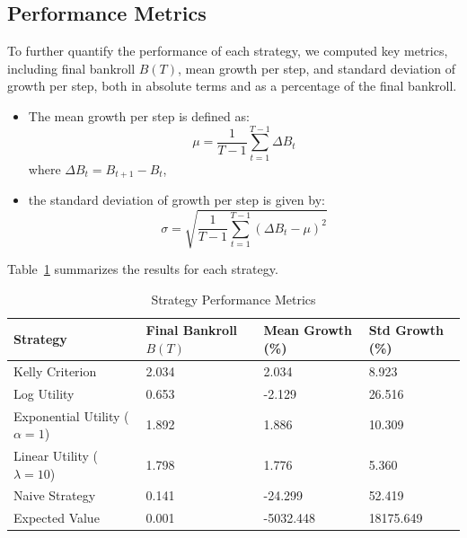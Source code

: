 \subsection{Performance Metrics}

To further quantify the performance of each strategy, we computed key metrics, including final bankroll \( B(T) \), mean growth per step, and standard deviation of growth per step, both in absolute terms and as a percentage of the final bankroll. 
\begin{itemize}
    \item The mean growth per step is defined as:
    \[
    \mu = \frac{1}{T-1} \sum_{t=1}^{T-1} \Delta B_t
    \]
    where \( \Delta B_t = B_{t+1} - B_t \),
    \item the standard deviation of growth per step is given by:
    \[
    \sigma = \sqrt{\frac{1}{T-1} \sum_{t=1}^{T-1} (\Delta B_t - \mu)^2}
    \]
\end{itemize}


Table~\ref{tab:strategy_performance} summarizes the results for each strategy.

\begin{table}[H]
\centering
\caption{Strategy Performance Metrics}
\label{tab:strategy_performance}
\begin{tabular}{llll}
\toprule
\textbf{Strategy}              & \textbf{Final Bankroll \( B(T) \)} & \textbf{Mean Growth (\%)} & \textbf{Std Growth (\%)} \\ 
\midrule
Kelly Criterion                & 2.034                              & 2.034                      & 8.923                    \\ 
Log Utility                    & 0.653                              & -2.129                     & 26.516                   \\ 
Exponential Utility (\( \alpha = 1 \)) & 1.892                        & 1.886                      & 10.309                   \\ 
Linear Utility (\( \lambda = 10 \))    & 1.798                        & 1.776                      & 5.360                    \\ 
Naive Strategy                 & 0.141                              & -24.299                    & 52.419                   \\ 
Expected Value                 & 0.001                              & -5032.448                  & 18175.649                \\
\bottomrule
\end{tabular}
\end{table}

